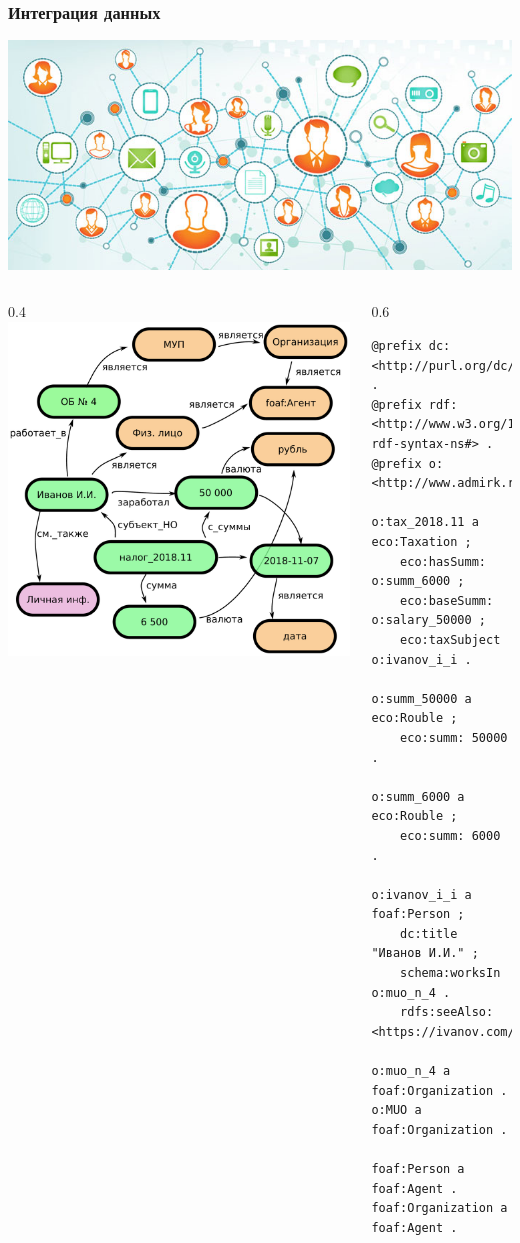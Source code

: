 \documentclass[10pt]{beamer}
\begin{document}
\begin{frame}[fragile]
  \frametitle{Интеграция данных}
  \begin{center}
      \includegraphics[width=0.5\linewidth]{pics/lod-pilot.jpg}
  \end{center}
  \begin{columns}
    \begin{column}{0.4\linewidth}
        \includegraphics[width=1\linewidth]{pics/a-box.pdf}
    \end{column}
    \begin{column}{0.6\linewidth}
\begin{verbatim}
@prefix dc: <http://purl.org/dc/elements/1.1/> .
@prefix rdf: <http://www.w3.org/1999/02/22-rdf-syntax-ns#> .
@prefix o: <http://www.admirk.ru/mup/accounting/4#>.

o:tax_2018.11 a eco:Taxation ;
    eco:hasSumm: o:summ_6000 ;
    eco:baseSumm: o:salary_50000 ;
    eco:taxSubject o:ivanov_i_i .

o:summ_50000 a eco:Rouble ;
    eco:summ: 50000 .

o:summ_6000 a eco:Rouble ;
    eco:summ: 6000 .

o:ivanov_i_i a foaf:Person ;
    dc:title "Иванов И.И." ;
    schema:worksIn o:muo_n_4 .
    rdfs:seeAlso: <https://ivanov.com/private_data#me>

o:muo_n_4 a foaf:Organization .
o:MUO a foaf:Organization .

foaf:Person a foaf:Agent .
foaf:Organization a foaf:Agent .

\end{verbatim}
    \end{column}
  \end{columns}
\end{frame}
\end{document}
